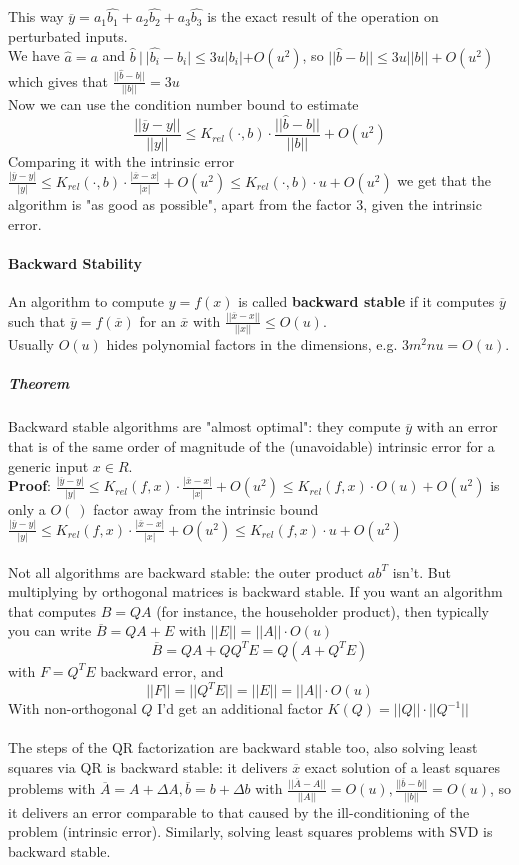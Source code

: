 \documentclass[10pt]{report}
\begin{document}
This way $\overline{y} = a_1\hat{b_1}+a_2\hat{b_2}+a_3\hat{b_3}$ is the exact result of the operation on perturbated inputs.\\
We have $\hat{a} = a$ and $\hat{b}\:|\:|\hat{b_i}-b_i|\leq 3u|b_i|+O(u^2)$, so $||\hat{b}-b||\leq 3u||b||+O(u^2)$ which gives that $\frac{||\hat{b}-b||}{||b||} = 3u$\\
Now we can use the condition number bound to estimate
$$\frac{||\overline{y}-y||}{||y||}\leq K_{rel}(\cdot,b)\cdot\frac{||\hat{b}-b||}{||b||} + O(u^2)$$
Comparing it with the intrinsic error $\frac{|\overline{y}-y|}{|y|}\leq K_{rel}(\cdot,b)\cdot\frac{|\overline{x}-x|}{|x|} + O(u^2)\leq K_{rel}(\cdot,b)\cdot u + O(u^2)$ we get that the  algorithm is "as good as possible", apart from the factor $3$, given the intrinsic error.
\paragraph{Backward Stability} An algorithm to compute $y=f(x)$ is called \textbf{backward stable} if it computes $\overline{y}$ such that $\overline{y}=f(\overline{x})$ for an $\overline{x}$ with $\frac{||\overline{x}-x||}{||x||}\leq O(u)$.\\
Usually $O(u)$ hides polynomial factors in the dimensions, e.g. $3m^2nu = O(u)$.
\subparagraph{Theorem} Backward stable algorithms are "almost optimal": they compute $\overline{y}$ with an error that is of the same order of magnitude of the (unavoidable) intrinsic error for a generic input $x\in R$.\\
\textbf{Proof}: $\frac{|\overline{y}-y|}{|y|}\leq K_{rel}(f,x)\cdot\frac{|\overline{x}-x|}{|x|} + O(u^2)\leq K_{rel}(f,x)\cdot O(u) + O(u^2)$ is only a $O(\:)$ factor away from the intrinsic bound $\frac{|\overline{y}-y|}{|y|}\leq K_{rel}(f,x)\cdot\frac{|\overline{x}-x|}{|x|} + O(u^2)\leq K_{rel}(f,x)\cdot u + O(u^2)$\\\\
Not all algorithms are backward stable: the outer product $ab^T$ isn't. But multiplying by orthogonal matrices is backward stable. If you want an algorithm that computes $B=QA$ (for instance, the householder product), then typically you can write $\overline{B} = QA + E$ with $||E||=||A||\cdot O(u)$
$$\overline{B} = QA + QQ^TE = Q(A+Q^TE)$$ with $F = Q^TE$ backward error, and $$||F||=||Q^TE||=||E||=||A||\cdot O(u)$$
With non-orthogonal $Q$ I'd get an additional factor $K(Q) = ||Q||\cdot||Q^{-1}||$\\\\
The steps of the QR factorization are backward stable too, also solving least squares via QR is backward stable: it delivers $\overline{x}$ exact solution of a least squares problems with $\overline{A} = A +\Delta A, \overline{b} = b+\Delta b$ with $\frac{||\overline{A}-A||}{||A||}=O(u),\frac{||\overline{b}-b||}{||b||}=O(u)$, so it delivers an error comparable to that caused by the ill-conditioning of the problem (intrinsic error). Similarly, solving least squares problems with SVD is backward stable.
\end{document}
